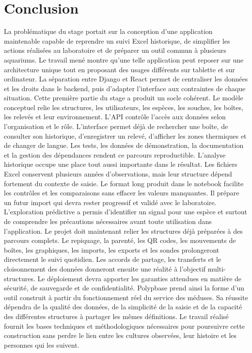 \documentclass{article}
\let\oldsection\section
\renewcommand{\section}{\clearpage\oldsection}
\begin{document}
\section{Conclusion}

La problématique du stage portait sur la conception d’une application maintenable capable de reprendre un suivi Excel historique, de simplifier les actions réalisées au laboratoire et de préparer un outil commun à plusieurs aquariums. Le travail mené montre qu’une telle application peut reposer sur une architecture unique tout en proposant des usages différents sur tablette et sur ordinateur. La séparation entre Django et React permet de centraliser les données et les droits dans le backend, puis d’adapter l’interface aux contraintes de chaque situation.
Cette première partie du stage a produit un socle cohérent. Le modèle conceptuel relie les structures, les utilisateurs, les espèces, les souches, les boîtes, les relevés et leur environnement. L’API contrôle l’accès aux données selon l’organisation et le rôle. L’interface permet déjà de rechercher une boîte, de consulter son historique, d’enregistrer un relevé, d’afficher les zones thermiques et de changer de langue. Les tests, les données de démonstration, la documentation et la gestion des dépendances rendent ce parcours reproductible.
L’analyse historique occupe une place tout aussi importante dans le résultat. Les fichiers Excel conservent plusieurs années d’observations, mais leur structure dépend fortement du contexte de saisie. Le format long produit dans le notebook facilite les contrôles et les comparaisons sans effacer les valeurs manquantes. Il prépare un futur import qui devra rester progressif et validé avec le laboratoire. L’exploration prédictive a permis d’identifier un signal pour une espèce et surtout de comprendre les précautions nécessaires avant toute utilisation dans l’application.
Le projet doit maintenant relier les structures déjà préparées à des parcours complets. Le repiquage, la parenté, les QR codes, les mouvements de boîtes, les graphiques, les imports, les exports et les sondes prolongeront directement le suivi quotidien. Les accords de partage, les transferts et le cloisonnement des données donneront ensuite une réalité à l’objectif multi-structures. Le déploiement devra apporter les garanties attendues en matière de sécurité, de sauvegarde et de confidentialité.
Polypbase prend ainsi la forme d’un outil construit à partir du fonctionnement réel du service des méduses. Sa réussite dépendra de la qualité des données, de la simplicité de la saisie et de la capacité des différentes structures à partager les mêmes définitions. Le travail réalisé fournit les bases techniques et méthodologiques nécessaires pour poursuivre cette construction sans perdre le lien entre les cultures observées, leur histoire et les personnes qui les suivent.
\end{document}
